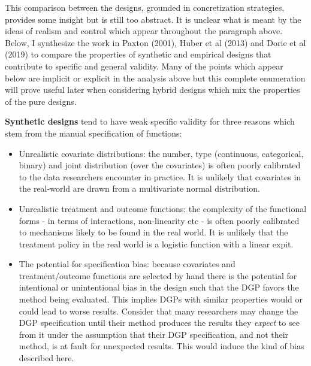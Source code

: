 \documentclass[../main.tex]{subfiles}
\begin{document}
\vspace{\baselineskip}
This comparison between the designs, grounded in concretization strategies, provides some insight but is still too abstract. It is unclear what is meant by the ideas of realism and control which appear throughout the paragraph above. Below, I synthesize the work in Paxton (2001), Huber et al (2013) and Dorie et al (2019) to compare the properties of synthetic and empirical designs that contribute to specific and general validity. Many of the points which appear below are implicit or explicit in the analysis above but this complete enumeration will prove useful later when considering hybrid designs which mix the properties of the pure designs.\par


\vspace{\baselineskip}
\textbf{Synthetic designs} tend to have weak specific validity for three reasons which stem from the manual specification of functions:\par


\vspace{\baselineskip}
\begin{itemize}
	\item Unrealistic covariate distributions: the number, type (continuous, categorical, binary) and joint distribution (over the covariates) is often poorly calibrated to the data researchers encounter in practice. It is unlikely that covariates in the real-world are drawn from a multivariate normal distribution.\par


\vspace{\baselineskip}
	\item Unrealistic treatment and outcome functions: the complexity of the functional forms - in terms of interactions, non-linearity etc - is often poorly calibrated to mechanisms likely to be found in the real world. It is unlikely that the treatment policy in the real world is a logistic function with a linear expit.\par


\vspace{\baselineskip}
	\item The potential for specification bias: because covariates and treatment/outcome functions are selected by hand there is the potential for intentional or unintentional bias in the design such that the DGP favors the method being evaluated. This implies DGPs with similar properties would or could lead to worse results. Consider that many researchers may change the DGP specification until their method produces the results they \textit{expect} to see from it under the assumption that their DGP specification, and not their method, is at fault for unexpected results. This would induce the kind of bias described here.
\end{itemize}\par
\end{document}
